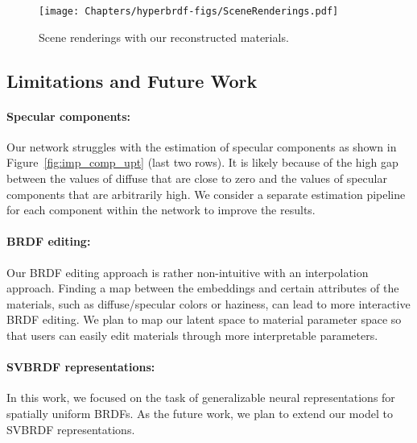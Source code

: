 \begin{figure}[h]
  \centering
  {\texttt{[image: Chapters/hyperbrdf-figs/SceneRenderings.pdf]}}
   \caption{Scene renderings with our reconstructed materials.}
   \label{fig:scene-render}
\end{figure}


\subsection{Limitations and Future Work}\label{sec:limits}
\paragraph{Specular components:} Our network struggles with the estimation of specular components as shown in Figure~\ref{fig:imp_comp_upt} (last two rows). It is likely because of the high gap between the values of diffuse that are close to zero and the values of specular components that are arbitrarily high. We consider a separate estimation pipeline for each component within the network to improve the results.


\paragraph{BRDF editing:} Our BRDF editing approach is rather non-intuitive with an interpolation approach. Finding a map between the embeddings and certain attributes of the materials, such as diffuse/specular colors or haziness, can lead to more interactive BRDF editing. We plan to map our latent space to material parameter space so that users can easily edit materials through more interpretable parameters.

\paragraph{SVBRDF representations:} In this work, we focused on the task of generalizable neural representations for spatially uniform BRDFs. As the future work, we plan to extend our model to SVBRDF representations.
